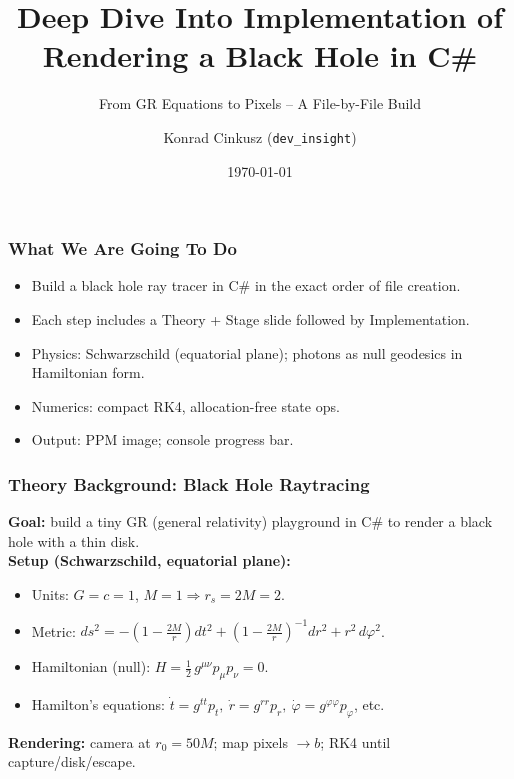 \documentclass[aspectratio=169]{beamer}
\title[Deep Dive: Black Hole in C\#]{Deep Dive Into Implementation of Rendering a Black Hole in C\#}
\subtitle{From GR Equations to Pixels -- A File-by-File Build}
\author[\href{https://github.com/konradcinkusz}{dev\_insight \,|\, github.com/konradcinkusz}]{Konrad Cinkusz (\texttt{dev\_insight})}
\institute{Numerical Methods \& Graphics Series}
\date{\today}
\newcommand{\ProgressStep}[1]{\progressstep{#1}}
\newcommand{\ThisFrameTitle}[1]{\frametitle{#1}}
\begin{document}
\begin{frame}
  \ProgressStep{-1}\ThisFrameTitle{}
  \titlepage
\end{frame}

\begin{frame}
  \ProgressStep{-1}\ThisFrameTitle{What We Are Going To Do}
  \begin{itemize}
    \item Build a black hole ray tracer in C\# in the exact order of file creation.
    \item Each step includes a Theory + Stage slide followed by Implementation.
    \item Physics: Schwarzschild (equatorial plane); photons as null geodesics in Hamiltonian form.
    \item Numerics: compact RK4, allocation-free state ops.
    \item Output: PPM image; console progress bar.
  \end{itemize}
\end{frame}

\begin{frame}
  \ProgressStep{-1}\ThisFrameTitle{Theory Background: Black Hole Raytracing}
  \textbf{Goal:} build a tiny GR (general relativity) playground in C\# to render a black hole with a thin disk.\\[0.6em]
  \textbf{Setup (Schwarzschild, equatorial plane):}
  \begin{itemize}
    \item Units: $G=c=1$, $M=1 \Rightarrow r_s=2M=2$.
    \item Metric: $ds^2 = -\!\left(1-\frac{2M}{r}\right)dt^2 + \left(1-\frac{2M}{r}\right)^{-1}dr^2 + r^2\,d\varphi^2$.
    \item Hamiltonian (null): $H=\tfrac12\,g^{\mu\nu}p_\mu p_\nu=0$.
    \item Hamilton's equations: $\dot{t}=g^{tt}p_t,\ \dot{r}=g^{rr}p_r,\ \dot{\varphi}=g^{\varphi\varphi}p_\varphi$, etc.
  \end{itemize}
  \textbf{Rendering:} camera at $r_0=50M$; map pixels $\to b$; RK4 until capture/disk/escape.
\end{frame}

\end{document}
